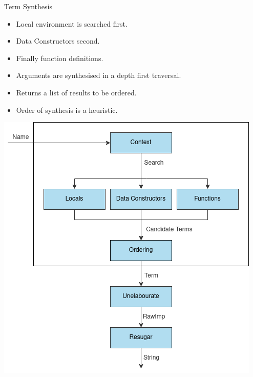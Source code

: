 \documentclass[presentation]{beamer}
\begin{document}
\begin{frame}[fragile]{Term Synthesis}
\begin{multicols}{2}
  \begin{itemize}
  \item Local environment is searched first.
  \item Data Constructors second.
  \item Finally function definitions.
  \item Arguments are synthesised in a depth first traversal.
  \item Returns a list of results to be ordered.
  \item Order of synthesis is a heuristic.
  \end{itemize}

  \includegraphics[scale=0.3]{Resource/syn.png}
  
\end{multicols}
\end{frame}
\end{document}
